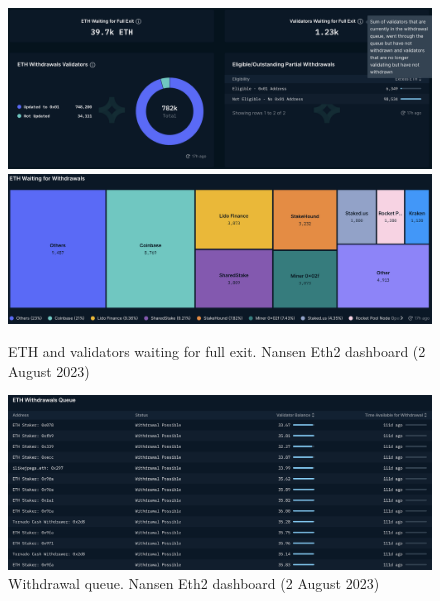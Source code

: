 \documentclass[UTF8]{article}
\begin{document}
\begin{figure}[htbp]
\begin{center}
\includegraphics[width=\linewidth]{images/nansen10}\\
\includegraphics[width=\linewidth]{images/nansen11}
\caption{ETH and validators waiting for full exit. Nansen Eth2 dashboard (2 August 2023)}
\label{fig:nansen10}
\end{center}
\end{figure}

\begin{figure}[htbp]
\begin{center}
\includegraphics[width=\linewidth]{images/nansen12}
\caption{Withdrawal queue. Nansen Eth2 dashboard (2 August 2023)}
\label{fig:nansen12}
\end{center}
\end{figure}
\end{document}

